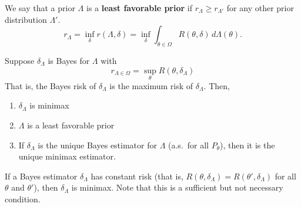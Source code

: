 \begin{defn}
We say that a prior $\Lambda$ is a \textbf{least favorable prior} if $r_\Lambda \geq r_{\Lambda'}$ for any other prior distribution $\Lambda'$.
\[
r_\Lambda = \inf_\delta r(\Lambda, \delta) = \inf_\delta \int_{\theta \in \Omega} R(\theta, \delta) \, d\Lambda(\theta).
\]
\end{defn}

\begin{thm}
Suppose $\delta_\Lambda$ is Bayes for $\Lambda$ with
\[
r_{\Lambda \in \Omega} = \sup_\theta R(\theta, \delta_\Lambda)
\]
That is, the Bayes risk of $\delta_\Lambda$ is the maximum risk of $\delta_\Lambda$. Then,
\begin{enumerate}
    \item $\delta_\Lambda$ is minimax
    \item $\Lambda$ is a least favorable prior
    \item If $\delta_\Lambda$ is the unique Bayes estimator for $\Lambda$ (a.s.\ for all $P_\theta$), then it is the unique minimax estimator.
\end{enumerate}
\end{thm}

\begin{cor}
\label{cor:minimax}
If a Bayes estimator $\delta_\Lambda$ has constant risk (that is, $R(\theta, \delta_\Lambda) = R(\theta', \delta_\Lambda)$ for all $\theta$ and $\theta'$), then $\delta_\Lambda$ is minimax. Note that this is a sufficient but not necessary condition.
\end{cor}

